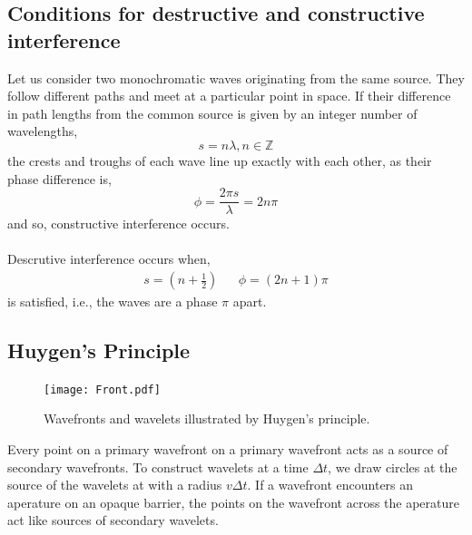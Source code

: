 \documentclass{book}
\begin{document}
\subsection{Conditions for destructive and constructive interference}
Let us consider two monochromatic waves originating from the same source. They follow different paths and meet at a particular point in space. If their difference in path lengths from the common source is given by an integer number of wavelengths,
\begin{equation}
	s = n\lambda, n \in \mathbb{Z}
\end{equation}
the crests and troughs of each wave line up exactly with each other, as their phase difference is,
\begin{equation}
	\phi = \frac{2\pi s}{\lambda} = 2n\pi
\end{equation}
and so, constructive interference occurs.
\\\\
Descrutive interference occurs when,
\begin{align}
	s = \left(n + \frac{1}{2}\right) && \phi = (2n+1)\pi
\end{align}
is satisfied, i.e., the waves are a phase $\pi$ apart.
\subsection{Huygen's Principle}
\begin{figure}[h]
	\centering
	\texttt{[image: Front.pdf]}
	\caption{Wavefronts and wavelets illustrated by Huygen's principle.}
	\label{huygen}
\end{figure}
Every point on a primary wavefront on a primary wavefront acts as a source of secondary wavefronts. To construct wavelets at a time $\Delta t$, we draw circles at the source of the wavelets at with a radius $v\Delta t$. If a wavefront encounters an aperature on an opaque barrier, the points on the wavefront across the aperature act like sources of secondary wavelets.
\end{document}
